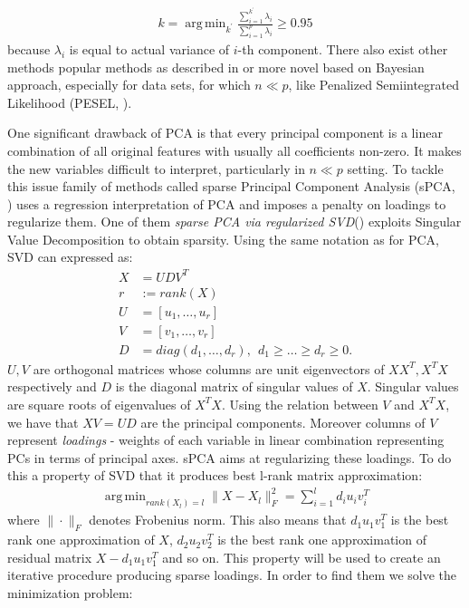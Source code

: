 \documentclass[12pt, wide]{mwart}
\DeclareMathOperator*{\argmin}{arg\,min}
\begin{document}
\begin{align*}
    k = \argmin_{k^{\prime}} \frac{\sum_{i=1}^{k^{\prime}} \lambda_i }{\sum_{i=1}^p \lambda_i} \geq 0.95
\end{align*}
because $\lambda_i$ is equal to actual variance of $i$-th component. There also exist other methods popular methods as described in \cite[chapter 6]{PCA} or more novel based on Bayesian approach, especially for data sets, for which $n \ll p$, like Penalized Semiintegrated Likelihood (PESEL, \cite{pesel}). 

One significant drawback of PCA is that every principal component is a linear combination of all original features with usually all coefficients non-zero. It makes the new variables difficult to interpret, particularly in $n \ll p $ setting. To tackle this issue family of methods called sparse Principal Component Analysis (sPCA, \cite{sPCAold}) uses a regression interpretation of PCA and imposes a penalty on loadings to regularize them. One of them \textit{sparse PCA via regularized SVD}(\cite{SPCAnew}) exploits Singular Value Decomposition to obtain sparsity. Using the same notation as for PCA, SVD can expressed as:
\begin{align*}
    X &= UDV^T \\
    r &:= rank(X) \\
    U &= [u_1, \ldots, u_r] \\
    V &= [v_1, \ldots, v_r] \\
    D &= diag(d_1, \ldots, d_r), \ \ d_1 \geq \ldots \geq d_r \geq 0. 
\end{align*}
$U, V$ are orthogonal matrices whose columns are unit eigenvectors of $XX^T, X^TX$ respectively and $D$ is the diagonal matrix of singular values of $X$. Singular values are square roots of eigenvalues of $X^TX$. Using the relation between $V$ and $X^TX$, we have that $XV = UD$ are the principal components. Moreover columns of $V$ represent \textit{loadings} - weights of each variable in linear combination representing PCs in terms of principal axes. sPCA aims at regularizing these loadings. To do this a property of SVD that it produces best l-rank matrix approximation:
\begin{align*}
    \argmin_{rank(X_l) = l}\| X - X_l \|_F^2 = \sum_{i=1}^l d_iu_iv_i^T
\end{align*} where $\| \cdot \|_F$ denotes Frobenius norm. This also means that $d_1u_1v_1^T$ is the best rank one approximation of $X$, $d_2u_2v_2^T$ is the best rank one approximation of residual matrix $X - d_1u_1v_1^T$ and so on. This property will be used to create an iterative procedure producing sparse loadings. In order to find them we solve the minimization problem:
\end{document}
